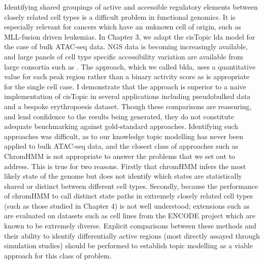 Identifying shared groupings of active and accessible regulatory elements between closely related cell types is a difficult problem in functional genomics. It is especially relevant for cancers which have an unknown cell of origin, such as MLL-fusion driven leukemias. In Chapter 3, we adapt the cisTopic \gls{lda} model for the case of bulk ATAC-seq data. NGS data is becoming increasingly available, and large panels of cell type specific accessibility variation are available from large consortia such as \textcite{ENCODEProjectConsortium2012}. The approach, which we called \gls{blda}, uses a quantitative value for each peak region rather than a binary activity score as is appropriate for the single cell case. I demonstrate that the approach is superior to a naive implementation of cisTopic in several applications including pseudobulked data and a bespoke erythropoesis dataset. Though these comparisons are reassuring, and lend confidence to the results being generated, they do not constitute adequate benchmarking against gold-standard approaches. Identifying such approaches was difficult, as to our knowledge topic modelling has never been applied to bulk ATAC-seq data, and the closest class of approaches such as ChromHMM is not appropriate to answer the problems that we set out to address. This is true for two reasons. Firstly that chromHMM infers the most likely state of the genome but does not identify which states are statistically shared or distinct between different cell types. Secondly, because the performance of chromHMM to call distinct state paths in extremely closely related cell types (such as those studied in Chapter 4) is not well understood; extensions such as \textcite{Marco2017} are evaluated on datasets such as cell lines from the ENCODE project which are known to be extremely diverse. Explicit comparisons between these methods and their ability to identify differentially active regions (most directly assayed through simulation studies) should be performed to establish topic modelling as a viable approach for this class of problem.

